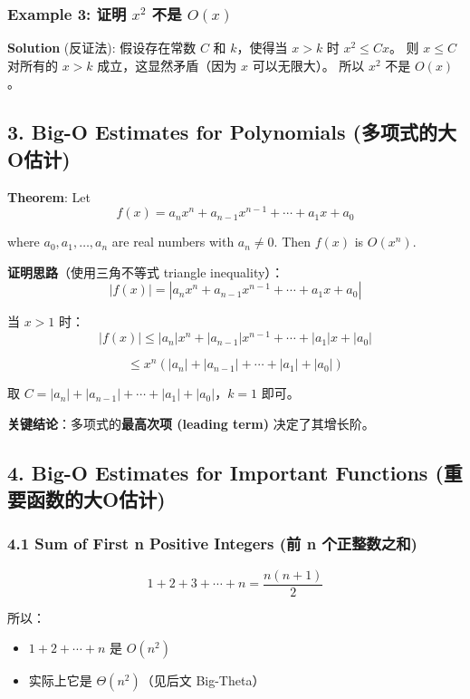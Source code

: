 \documentclass[10pt,a4paper,openany]{ctexbook}
\theoremstyle{definition}
\theoremstyle{remark}
\renewenvironment{quote}
  {\list{}{\leftmargin=1em\rightmargin=0pt\topsep=0.5pt\partopsep=0pt}\item[]}
  {\endlist}
\begin{document}
\subsubsection{Example 3: 证明 $x^2$ 不是 $O(x)$}

\textbf{Solution} (反证法):
假设存在常数 $C$ 和 $k$，使得当 $x > k$ 时 $x^2 \leq Cx$。
则 $x \leq C$ 对所有的 $x > k$ 成立，这显然矛盾（因为 $x$ 可以无限大）。
所以 $x^2$ 不是 $O(x)$。
\vspace{-2pt}

\subsection{3. Big-O Estimates for Polynomials (多项式的大O估计)}

\begin{quote}
\textbf{Theorem}: Let
\[
f(x) = a_n x^n + a_{n-1} x^{n-1} + \cdots + a_1 x + a_0
\]

where $a_0, a_1, \dots, a_n$ are real numbers with $a_n \neq 0$.
Then $f(x)$ is $O(x^n)$.

\textbf{证明思路}（使用三角不等式 triangle inequality）：
\[
|f(x)| = |a_n x^n + a_{n-1} x^{n-1} + \cdots + a_1 x + a_0|
\]


当 $x > 1$ 时：
\[
|f(x)| \leq |a_n|x^n + |a_{n-1}|x^{n-1} + \cdots + |a_1|x + |a_0|
\]

\[
\leq x^n(|a_n| + |a_{n-1}| + \cdots + |a_1| + |a_0|)
\]


取 $C = |a_n| + |a_{n-1}| + \cdots + |a_1| + |a_0|$，$k = 1$ 即可。

\textbf{关键结论}：多项式的\textbf{最高次项 (leading term)} 决定了其增长阶。

\end{quote}
\vspace{-2pt}

\subsection{4. Big-O Estimates for Important Functions (重要函数的大O估计)}

\subsubsection{4.1 Sum of First n Positive Integers (前 n 个正整数之和)}

\[
1 + 2 + 3 + \cdots + n = \frac{n(n+1)}{2}
\]

所以：
\begin{itemize}
\item $1 + 2 + \cdots + n$ 是 $O(n^2)$
\item 实际上它是 $\Theta(n^2)$（见后文 Big-Theta）

\end{itemize}
\end{document}
